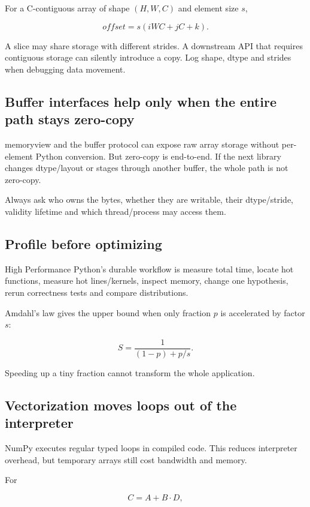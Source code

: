 For a C-contiguous array of shape \((H,W,C)\) and element size \(s\),

\[
offset=s(iWC+jC+k).
\]

A slice may share storage with different strides. A downstream API that requires contiguous storage can silently introduce a copy. Log shape, dtype and strides when debugging data movement.

\subsection{Buffer interfaces help only when the entire path stays zero-copy}\label{buffer-interfaces-help-only-when-the-entire-path-stays-zero-copy}

memoryview and the buffer protocol can expose raw array storage without per-element Python conversion. But zero-copy is end-to-end. If the next library changes dtype/layout or stages through another buffer, the whole path is not zero-copy.

Always ask who owns the bytes, whether they are writable, their dtype/stride, validity lifetime and which thread/process may access them.

\subsection{Profile before optimizing}\label{profile-before-optimizing}

High Performance Python's durable workflow is measure total time, locate hot functions, measure hot lines/kernels, inspect memory, change one hypothesis, rerun correctness tests and compare distributions.

Amdahl's law gives the upper bound when only fraction \(p\) is accelerated by factor \(s\):

\[
S=\frac{1}{(1-p)+p/s}.
\]

Speeding up a tiny fraction cannot transform the whole application.

\subsection{Vectorization moves loops out of the interpreter}\label{vectorization-moves-loops-out-of-the-interpreter}

NumPy executes regular typed loops in compiled code. This reduces interpreter overhead, but temporary arrays still cost bandwidth and memory.

For

\[
C=A+B\cdot D,
\]

